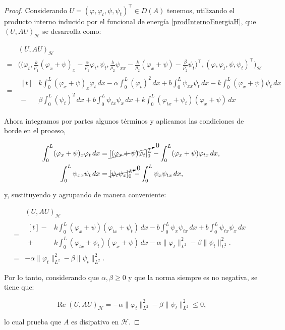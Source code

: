 \begin{proof}
    Considerando $U = (\varphi, \varphi_t, \psi, \psi_t)^\top \in D(A)$ tenemos, utilizando el producto interno inducido por el funcional de energía \eqref{prodInternoEnergiaH}, que $(U, AU)_{\mathcal{H}}$ se desarrolla como:

    \begin{align*}
        &(U, AU)_{\mathcal{H}}\\
        = &\Bigg(\bigg(\varphi_t, \frac{k}{\rho_1}(\varphi_{x} + \psi)_x - \frac{\alpha}{\rho_1}\varphi_t, \psi_t, \frac{b}{\rho_2}\psi_{xx} -\frac{k}{\rho_2}(\varphi_x + \psi) - \frac{\beta}{\rho_2}\psi_t \bigg)^\top,  (\varphi, \varphi_t, \psi, \psi_t)^\top\Bigg)_{\mathcal{H}}\\
        =&\begin{aligned}[t]
             &k\int_0^L(\varphi_x + \psi)_x \varphi_t \, dx - \alpha\int_0^L(\varphi_t)^2 \, dx  + b\int_0^L\psi_{xx}\psi_t \, dx - k\int_0^L(\varphi_x + \psi)\psi_t \, dx\\
            -& \beta\int_0^L(\psi_t)^2 \, dx + b\int_0^L \psi_{tx} \psi_x \, dx + k \int_0^L (\varphi_{tx} + \psi_t)(\varphi_x + \psi) \, dx
        \end{aligned}
    \end{align*}

    Ahora integramos por partes algunos términos y aplicamos las condiciones de borde en el proceso,

    \begin{align*}
        \int_0^L(\varphi_x + \psi)_x \varphi_t \, dx &= \cancelto{0}{[(\varphi_x + \psi)\varphi_t]_0^L} - \int_0^L(\varphi_x + \psi)\varphi_{tx} \, dx,\\
        \int_0^L\psi_{xx}\psi_t \, dx &= \cancelto{0}{[\psi_t\psi_x]_0^L} - \int_0^L \psi_x \psi_{tx} \, dx,
    \end{align*}

    y, sustituyendo y agrupando de manera conveniente:

    \begin{align*}
        &(U, AU)_{\mathcal{H}}\\
        =&\begin{aligned}[t]
            -&k\int_0^L(\varphi_x + \psi) (\varphi_{tx} + \psi_t) \, dx -b\int_0^L\psi_x \psi_{tx} \, dx + b\int_0^L \psi_{tx} \psi_x \, dx\\
            +& k \int_0^L (\varphi_{tx} + \psi_t)(\varphi_x + \psi) \, dx -\alpha\lVert\varphi_t\lVert^2_{L^2} - \beta\lVert\psi_t\rVert^2_{L^2}.
        \end{aligned}\\
        =& -\alpha\lVert\varphi_t\lVert^2_{L^2} - \beta\lVert\psi_t\rVert^2_{L^2}.
    \end{align*}

    Por lo tanto, considerando que $\alpha,\beta \geq 0$ y que la norma siempre es no negativa, se tiene que:

    \[\operatorname{Re}(U,AU)_{\mathcal{H}} = -\alpha\lVert\varphi_t\lVert^2_{L^2} - \beta\lVert\psi_t\rVert^2_{L^2} \leq 0,\]

    lo cual prueba que $A$ es disipativo en $\mathcal{H}$.
\end{proof}

